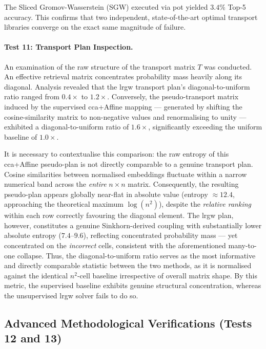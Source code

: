 The Sliced Gromov-Wasserstein (SGW) executed via \gls{pot} yielded $3.4\%$ Top-5 accuracy. This confirms that two independent, state-of-the-art optimal transport libraries converge on the exact same magnitude of failure.

\paragraph{Test 11: Transport Plan Inspection.}
An examination of the raw structure of the transport matrix $T$ was conducted. An effective retrieval matrix concentrates probability mass heavily along its diagonal. Analysis revealed that the \gls{lrgw} transport plan's diagonal-to-uniform ratio ranged from $0.4\times$ to $1.2\times$. Conversely, the pseudo-transport matrix induced by the supervised \gls{cca}+Affine mapping --- generated by shifting the cosine-similarity matrix to non-negative values and renormalising to unity --- exhibited a diagonal-to-uniform ratio of $1.6\times$, significantly exceeding the uniform baseline of $1.0\times$.

It is necessary to contextualise this comparison: the raw entropy of this \gls{cca}+Affine pseudo-plan is not directly comparable to a genuine transport plan. Cosine similarities between normalised embeddings fluctuate within a narrow numerical band across the \emph{entire} $n \times n$ matrix. Consequently, the resulting pseudo-plan appears globally near-flat in absolute value (entropy $\approx 12.4$, approaching the theoretical maximum $\log(n^2)$), despite the \emph{relative ranking} within each row correctly favouring the diagonal element. The \gls{lrgw} plan, however, constitutes a genuine Sinkhorn-derived coupling with substantially lower absolute entropy ($7.4$--$9.6$), reflecting concentrated probability mass --- yet concentrated on the \emph{incorrect} cells, consistent with the aforementioned many-to-one collapse. Thus, the diagonal-to-uniform ratio serves as the most informative and directly comparable statistic between the two methods, as it is normalised against the identical $n^2$-cell baseline irrespective of overall matrix shape. By this metric, the supervised baseline exhibits genuine structural concentration, whereas the unsupervised \gls{lrgw} solver fails to do so.

\subsection{Advanced Methodological Verifications (Tests 12 and 13)}
\label{subsec:advanced_verifications}

